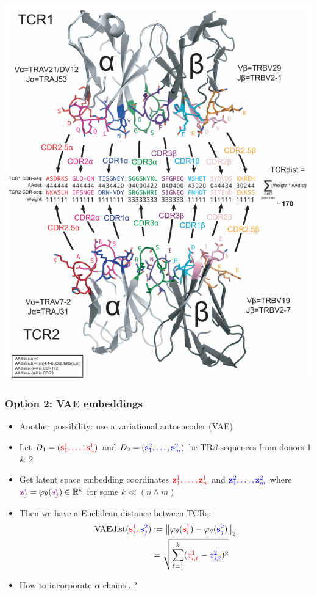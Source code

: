 \documentclass[mathserif,compress,xcolor={dvipsnames}]{beamer}
\newcommand*\reals{\mathbb{R}}
\newcommand*\ba{\[ \begin{aligned}}
\newcommand*\ea{\end{aligned} \]}
\newcommand*\norm[1]{\left\|#1\right\|}
\renewcommand\;{\,}
\renewcommand\phi{\varphi}
\newcommand{\bs}{\mathbf s}
\newcommand{\bz}{\mathbf z}
\begin{document}
\begin{frame}
\begin{center}
\includegraphics[width=0.7\linewidth]{Figures/TCRdist.png}
\end{center}
\end{frame}

\begin{frame}\frametitle{Option 2: VAE embeddings}
\begin{itemize}
\item
Another possibility: use a variational autoencoder (VAE)
\bigskip
\item
Let $D_1 = ({\color{red} \bs_{1}^1, \dotsc, \bs_{n}^1})$ and $D_2 = ({\color{blue} \bs_{1}^2, \dotsc, \bs_{m}^2} )$ be TR$\beta$ sequences from donors 1 \& 2
\bigskip
\item
Get latent space embedding coordinates ${\color{red} \bz_1^1, \dotsc, \bz_n^1}$ and ${\color{blue} \bz_1^2, \dotsc, \bz_m^2}$
 where
${\color{Purple} \bz_j^i} = \phi_\theta({\color{Purple} \bs_j^i}) \in \reals^k$ for some $k \ll (n \wedge m)$
\bigskip
\item
Then we have a Euclidean distance between TCRs:
\ba
\text{VAEdist}({\color{red} \bs_i^1}, {\color{blue} \bs_j^2})
	& :=  \norm{ \phi_\theta({\color{red} \bs_i^1}) - \phi_\theta({\color{blue} \bs_j^2}) }_2 \\
	& = \sqrt{ \sum_{\ell=1}^k ({\color{red} z_{i, \ell}^1} - {\color{blue} z_{j, \ell}^2} )^2 }
\ea
\item How to incorporate $\alpha$ chains...?
\end{itemize}
\end{frame}
\end{document}
